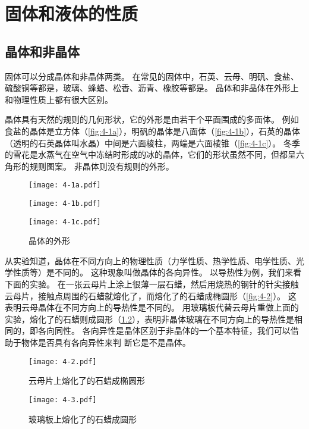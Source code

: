 
\chapter{固体和液体的性质}
\section{晶体和非晶体}
固体可以分成晶体和非晶体两类。
在常见的固体中，石英、云母、明矾、食盐、硫酸铜等都是，玻璃、蜂蜡、松香、沥青、橡胶等都是。
晶体和非晶体在外形上和物理性质上都有很大区别。

晶体具有天然的规则的几何形状，它的外形是由若干个平面围成的多面体。
例如食盐的晶体是立方体（\cref{fig:4-1a}），明矾的晶体是八面体（\cref{fig:4-1b}），石英的晶体（透明的石英晶体叫水晶）中间是六面棱柱，两端是六面棱锥（\cref{fig:4-1c}）。
冬季的雪花是水蒸气在空气中冻结时形成的冰的晶体，它们的形状虽然不同，但都呈六角形的规则图案。
非晶体则没有规则的外形。
\begin{figure}
	\begin{minipage}[b]{0.3\linewidth}\centering
	  \texttt{[image: 4-1a.pdf]}
		\label{fig:4-1a}
	\end{minipage}
	\begin{minipage}[b]{0.3\linewidth}\centering
	  \texttt{[image: 4-1b.pdf]}
		\label{fig:4-1b}
	\end{minipage}
	\begin{minipage}[b]{0.37\linewidth}\centering
	  \texttt{[image: 4-1c.pdf]}
		\label{fig:4-1c}
	\end{minipage}
	\caption{晶体的外形}\label{fig:4-1}
\end{figure}

从实验知道，晶体在不同方向上的物理性质（力学性质、热学性质、电学性质、光学性质等）是不同的。
这种现象叫做晶体的各向异性。
以导热性为例，我们来看下面的实验。
在一张云母片上涂上很薄一层石蜡，然后用烧热的钢针的针尖接触云母片，接触点周围的石蜡就熔化了，而熔化了的石蜡成椭圆形（\cref{fig:4-2}）。
这表明云母晶体在不同方向上的导热性是不同的。
用玻璃板代替云母片重做上面的实验，熔化了的石蜡则成圆形（\cref{fig:4-3}），表明非晶体玻璃在不同方向上的导热性是相同的，即各向同性。
各向异性是晶体区别于非晶体的一个基本特征，我们可以借助于物体是否具有各向异性来判
断它是不是晶体。

\begin{figure}
	\begin{minipage}{0.48\linewidth}\centering
	  \texttt{[image: 4-2.pdf]}
		\caption{云母片上熔化了的石蜡成椭圆形}\label{fig:4-2}
	\end{minipage}
	\begin{minipage}{0.48\linewidth}\centering
	  \texttt{[image: 4-3.pdf]}
		\caption{玻璃板上熔化了的石蜡成圆形}\label{fig:4-3}
	\end{minipage}
\end{figure}

